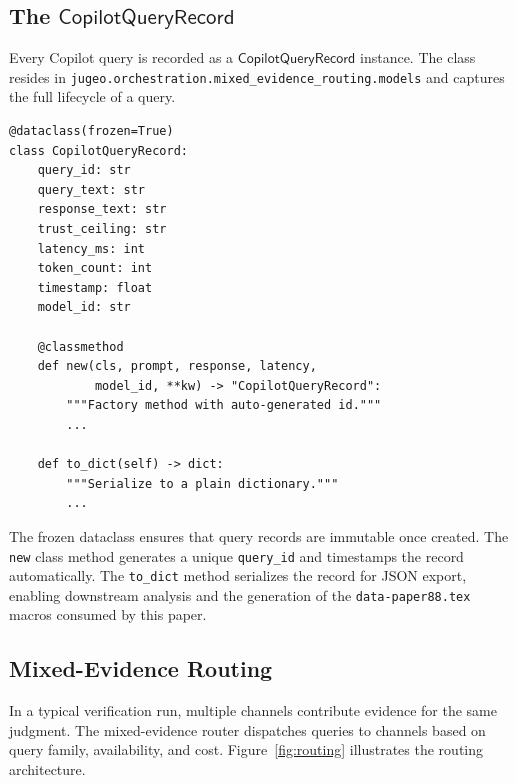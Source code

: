 \documentclass[11pt]{article}
\newcommand{\QRec}{\mathsf{CopilotQueryRecord}}
\newcommand{\toDict}{\texttt{to\_dict}}
\begin{document}
\subsection{The \texorpdfstring{$\QRec$}{CopilotQueryRecord}}
\label{sec:gateway:record}

Every Copilot query is recorded as a $\QRec$ instance.  The
class resides in
\texttt{jugeo.orchestration.mixed\_evidence\_routing.models}
and captures the full lifecycle of a query.

\begin{lstlisting}[style=jugeo-python,caption={The \texttt{CopilotQueryRecord} class (simplified).},label=lst:queryrecord]
@dataclass(frozen=True)
class CopilotQueryRecord:
    query_id: str
    query_text: str
    response_text: str
    trust_ceiling: str
    latency_ms: int
    token_count: int
    timestamp: float
    model_id: str

    @classmethod
    def new(cls, prompt, response, latency,
            model_id, **kw) -> "CopilotQueryRecord":
        """Factory method with auto-generated id."""
        ...

    def to_dict(self) -> dict:
        """Serialize to a plain dictionary."""
        ...
\end{lstlisting}

The frozen dataclass ensures that query records are immutable
once created.  The \texttt{new} class method generates a unique
\texttt{query\_id} and timestamps the record automatically.
The \toDict{} method serializes the record for JSON export,
enabling downstream analysis and the generation of the
\texttt{data-paper88.tex} macros consumed by this paper.

\subsection{Mixed-Evidence Routing}
\label{sec:gateway:routing}

In a typical verification run, multiple channels contribute
evidence for the same judgment.  The mixed-evidence router
dispatches queries to channels based on query family,
availability, and cost.  Figure~\ref{fig:routing} illustrates
the routing architecture.
\end{document}
